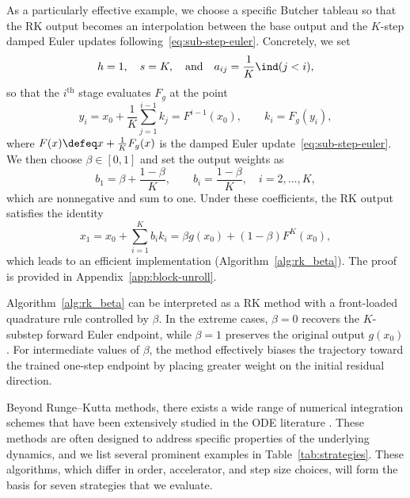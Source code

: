 As a particularly effective example, we choose a specific Butcher tableau so that the RK output becomes an interpolation between the base output and the $K$-step damped Euler updates following~\eqref{eq:sub-step-euler}. Concretely, we set
\begin{equation}
h=1,\quad s=K,\quad\text{and}\quad a_{ij}=\frac{1}{K}\ind(j<i),
\label{eq:rk-euler-chain-aij}
\end{equation}
so that the $i^\text{th}$ stage evaluates $F_g$ at the point
\begin{equation}\label{eq:yi}
y_i=x_0+\frac{1}{K}\sum_{j=1}^{i-1}k_j
    = F^{i-1}(x_0),\qquad k_i=F_g(y_i),
\end{equation}
where $F(x)\defeq x+\frac{1}{K}F_g(x)$ is the damped Euler update~\eqref{eq:sub-step-euler}. We then choose $\beta\in[0,1]$ and set the output weights as
\begin{equation}
b_1=\beta+\frac{1-\beta}{K},
\qquad
b_i=\frac{1-\beta}{K},\quad i=2,\ldots,K,
\label{eq:rk-beta-bi}
\end{equation}
which are nonnegative and sum to one. Under these coefficients, the RK output satisfies the identity
\begin{equation}
x_1=x_0+\sum_{i=1}^{K} b_i k_i=\beta g(x_0)+(1-\beta)F^{K}(x_0),
\label{eq:rk-beta-equivalence}
\end{equation}
which leads to an efficient implementation (Algorithm~\ref{alg:rk_beta}). The proof is provided in Appendix~\ref{app:block-unroll}.

Algorithm~\ref{alg:rk_beta} can be interpreted as a RK method with a front-loaded quadrature rule controlled by $\beta$. In the extreme cases, $\beta=0$ recovers the $K$-substep forward Euler endpoint, while $\beta=1$ preserves the original output $g(x_0)$. For intermediate values of $\beta$, the method effectively biases the trajectory toward the trained one-step endpoint by placing greater weight on the initial residual direction.



Beyond Runge--Kutta methods, there exists a wide range of numerical integration schemes that have been extensively studied in the ODE literature \citep{walker2011anderson,bai2019deep}. These methods are often designed to address specific properties of the underlying dynamics, and we list several prominent examples in Table~\ref{tab:strategies}. These algorithms, which differ in order, accelerator, and step size choices, will form the basis for seven strategies that we evaluate.
